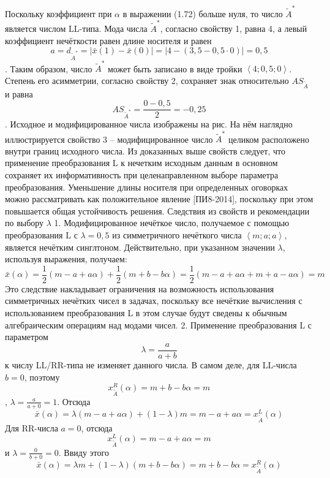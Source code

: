 Поскольку коэффициент при $\alpha $ в выражении (1.72) больше нуля, то число ${{\tilde{A}}^{*}}$ является числом LL-типа. Мода числа ${{\tilde{A}}^{*}}$, согласно свойству 1, равна 4, а левый коэффициент нечёткости равен длине носителя и равен
	\[a={{d}_{{{{\tilde{A}}}^{*}}}}=\left| \bar{x}\left( 1 \right)-\bar{x}\left( 0 \right) \right|=\left| 4-\left( 3,5-0,5\cdot 0 \right) \right|=0,5\].
Таким образом, число ${{\tilde{A}}^{*}}$ может быть записано в виде тройки $\left\langle 4;0,5;0 \right\rangle $. Степень его асимметрии, согласно свойству 2, сохраняет знак относительно $A{{S}_{{\tilde{A}}}}$ и равна
	\[A{{S}_{{{{\tilde{A}}}^{*}}}}=\frac{0-0,5}{2}=-0,25\].
Исходное и модифицированное числа изображены на рис. На нём наглядно иллюстрируется свойство 3 – модифицированное число ${{\tilde{A}}^{*}}$ целиком расположено внутри границ исходного числа.
Из доказанных выше свойств следует, что применение преобразования L к нечетким исходным данным в основном сохраняет их информативность при целенаправленном выборе параметра преобразования. Уменьшение длины носителя при определенных оговорках можно рассматривать как положительное явление [ПИ8-2014], поскольку при этом повышается общая устойчивость решения.
Следствия из свойств и рекомендации по выбору $\lambda $ 
1. Модифицированное нечёткое число, получаемое с помощью преобразования L с $\lambda =0,5$ из симметричного нечёткого числа $\left\langle m;a;a \right\rangle $, является нечётким синглтоном.
Действительно, при указанном значении $\lambda $, используя выражения, получаем:
	\[\bar{x}\left( \alpha  \right)=\frac{1}{2}\left( m-a+a\alpha  \right)+\frac{1}{2}\left( m+b-b\alpha  \right)=\frac{1}{2}\left( m-a+a\alpha +m+a-a\alpha  \right)=m\] 
Это следствие накладывает ограничения на возможность использования симметричных нечётких чисел в задачах, поскольку все нечёткие вычисления с использованием преобразования L в этом случае будут сведены к обычным алгебраическим операциям над модами чисел.
2. Применение преобразования L с параметром \[\lambda =\frac{a}{a+b}\] к числу LL/RR-типа не изменяет данного числа.
В самом деле, для LL-числа $b=0$, поэтому \[x_{{\tilde{A}}}^{R}\left( \alpha  \right)=m+b-b\alpha =m\], $\lambda =\frac{a}{a+0}=1$. Отсюда
	\[\bar{x}\left( \alpha  \right)=\lambda \left( m-a+a\alpha  \right)+\left( 1-\lambda  \right)m=m-a+a\alpha =x_{{\tilde{A}}}^{L}\left( \alpha  \right)\] 
Для RR-числа $a=0$, отсюда \[x_{{\tilde{A}}}^{L}\left( \alpha  \right)=m-a+a\alpha =m\] и $\lambda =\frac{0}{b+0}=0$. Ввиду этого
	\[\bar{x}\left( \alpha  \right)=\lambda m+\left( 1-\lambda  \right)\left( m+b-b\alpha  \right)=m+b-b\alpha =x_{{\tilde{A}}}^{R}\left( \alpha  \right)\] 
